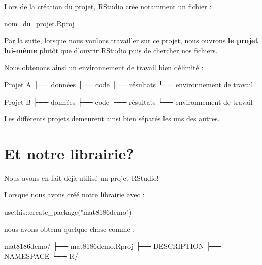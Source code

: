 \documentclass[
  letterpaper,
  DIV=11,
  numbers=noendperiod]{scrreprt}
\newenvironment{Shaded}{\begin{snugshade}}{\end{snugshade}}
\newcommand{\FunctionTok}[1]{\textcolor[rgb]{0.28,0.35,0.67}{#1}}
\newcommand{\NormalTok}[1]{\textcolor[rgb]{0.00,0.23,0.31}{#1}}
\newcommand{\SpecialCharTok}[1]{\textcolor[rgb]{0.37,0.37,0.37}{#1}}
\newcommand{\StringTok}[1]{\textcolor[rgb]{0.13,0.47,0.30}{#1}}
\begin{document}
Lors de la création du projet, RStudio crée notamment un fichier :

\begin{Shaded}
\begin{Highlighting}[]
\NormalTok{nom\_du\_projet.Rproj}
\end{Highlighting}
\end{Shaded}

Par la suite, lorsque nous voulons travailler sur ce projet, nous
ouvrons \textbf{le projet lui-même} plutôt que d'ouvrir RStudio puis de
chercher nos fichiers.

Nous obtenons ainsi un environnement de travail bien délimité :

\begin{Shaded}
\begin{Highlighting}[]
\NormalTok{Projet A}
\NormalTok{├── données}
\NormalTok{├── code}
\NormalTok{├── résultats}
\NormalTok{└── environnement de travail}

\NormalTok{Projet B}
\NormalTok{├── données}
\NormalTok{├── code}
\NormalTok{├── résultats}
\NormalTok{└── environnement de travail}
\end{Highlighting}
\end{Shaded}

Les différents projets demeurent ainsi bien séparés les uns des autres.

\section*{Et notre librairie?}\label{et-notre-librairie}


Nous avons en fait déjà utilisé un projet RStudio!

Lorsque nous avons créé notre librairie avec :

\begin{Shaded}
\begin{Highlighting}[]
\NormalTok{usethis}\SpecialCharTok{::}\FunctionTok{create\_package}\NormalTok{(}\StringTok{"mat8186demo"}\NormalTok{)}
\end{Highlighting}
\end{Shaded}

nous avons obtenu quelque chose comme :

\begin{Shaded}
\begin{Highlighting}[]
\NormalTok{mat8186demo/}
\NormalTok{├── mat8186demo.Rproj}
\NormalTok{├── DESCRIPTION}
\NormalTok{├── NAMESPACE}
\NormalTok{└── R/}
\end{Highlighting}
\end{Shaded}
\end{document}
